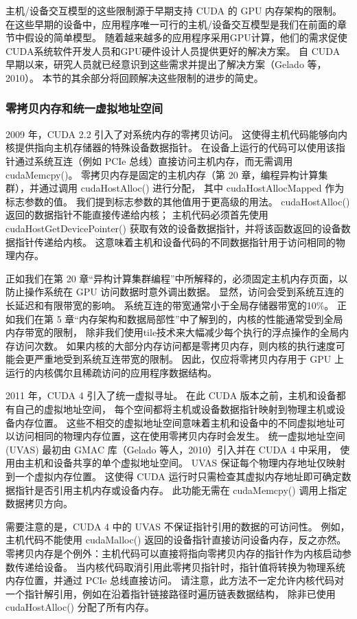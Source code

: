 主机/设备交互模型的这些限制源于早期支持 CUDA 的 GPU 内存架构的限制。 
在这些早期的设备中，应用程序唯一可行的主机/设备交互模型是我们在前面的章节中假设的简单模型。 
随着越来越多的应用程序采用GPU计算，他们的需求促使CUDA系统软件开发人员和GPU硬件设计人员提供更好的解决方案。 
自 CUDA 早期以来，研究人员就已经意识到这些需求并提出了解决方案（Gelado 等，2010）。 
本节的其余部分将回顾解决这些限制的进步的简史。

\subsubsection{零拷贝内存和统一虚拟地址空间}
2009 年，CUDA 2.2 引入了对系统内存的零拷贝访问。 这使得主机代码能够向内核提供指向主机存储器的特殊设备数据指针。 
在设备上运行的代码可以使用该指针通过系统互连（例如 PCIe 总线）直接访问主机内存，而无需调用 cudaMemcpy()。 
零拷贝内存是固定的主机内存（第 20 章，编程异构计算集群），并通过调用 cudaHostAlloc() 进行分配，
其中 cudaHostAllocMapped 作为标志参数的值。 我们提到标志参数的其他值用于更高级的用法。 
cudaHostAlloc()返回的数据指针不能直接传递给内核； 
主机代码必须首先使用 cudaHostGetDevicePointer() 获取有效的设备数据指针，并将该函数返回的设备数据指针传递给内核。 
这意味着主机和设备代码的不同数据指针用于访问相同的物理内存。

正如我们在第 20 章“异构计算集群编程”中所解释的，必须固定主机内存页面，以防止操作系统在 GPU 访问数据时意外调出数据。 
显然，访问会受到系统互连的长延迟和有限带宽的影响。 系统互连的带宽通常小于全局存储器带宽的10\%。 
正如我们在第 5 章“内存架构和数据局部性”中了解到的，内核的性能通常受到全局内存带宽的限制，
除非我们使用tile技术来大幅减少每个执行的浮点操作的全局内存访问次数。 
如果内核的大部分内存访问都是零拷贝内存，则内核的执行速度可能会更严重地受到系统互连带宽的限制。 
因此，仅应将零拷贝内存用于 GPU 上运行的内核偶尔且稀疏访问的应用程序数据结构。

2011 年，CUDA 4 引入了统一虚拟寻址。 在此 CUDA 版本之前，主机和设备都有自己的虚拟地址空间，
每个空间都将主机或设备数据指针映射到物理主机或设备内存位置。 
这些不相交的虚拟地址空间意味着主机和设备中的不同虚拟地址可以访问相同的物理内存位置，这在使用零拷贝内存时会发生。 
统一虚拟地址空间 (UVAS) 最初由 GMAC 库（Gelado 等人，2010）引入并在 CUDA 4 中采用，
使用由主机和设备共享的单个虚拟地址空间。 UVAS 保证每个物理内存地址仅映射到一个虚拟内存位置。 
这使得 CUDA 运行时只需检查其虚拟内存地址即可确定数据指针是否引用主机内存或设备内存。 
此功能无需在 cudaMemcpy() 调用上指定数据拷贝方向。

需要注意的是，CUDA 4 中的 UVAS 不保证指针引用的数据的可访问性。 
例如，主机代码不能使用 cudaMalloc() 返回的设备指针直接访问设备内存，反之亦然。 
零拷贝内存是个例外：主机代码可以直接将指向零拷贝内存的指针作为内核启动参数传递给设备。 
当内核代码取消引用此零拷贝指针时，指针值将转换为物理系统内存位置，并通过 PCIe 总线直接访问。 
请注意，此方法不一定允许内核代码对一个指针解引用，例如在沿着指针链接路径时遍历链表数据结构，
除非已使用 cudaHostAlloc() 分配了所有内存。

